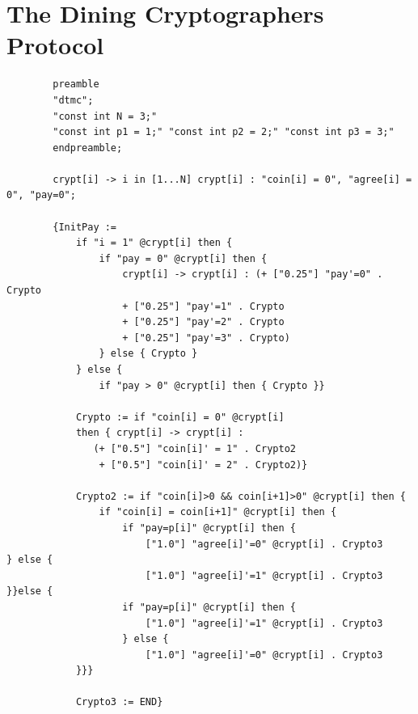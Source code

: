 \section{The Dining Cryptographers Protocol}
\label{app:dining-cryptos}
\begin{listing}[h!]
	\begin{verbatim}
		preamble
		"dtmc";
		"const int N = 3;"
		"const int p1 = 1;" "const int p2 = 2;" "const int p3 = 3;"
		endpreamble;
		
		crypt[i] -> i in [1...N] crypt[i] : "coin[i] = 0", "agree[i] = 0", "pay=0";
		
		{InitPay :=
			if "i = 1" @crypt[i] then {
				if "pay = 0" @crypt[i] then {
					crypt[i] -> crypt[i] : (+ ["0.25"] "pay'=0" . Crypto
					+ ["0.25"] "pay'=1" . Crypto
					+ ["0.25"] "pay'=2" . Crypto
					+ ["0.25"] "pay'=3" . Crypto)
				} else { Crypto }
			} else {
				if "pay > 0" @crypt[i] then { Crypto }}	
					
			Crypto := if "coin[i] = 0" @crypt[i]
			then { crypt[i] -> crypt[i] : 
			   (+ ["0.5"] "coin[i]' = 1" . Crypto2
				+ ["0.5"] "coin[i]' = 2" . Crypto2)}
							
			Crypto2 := if "coin[i]>0 && coin[i+1]>0" @crypt[i] then {
				if "coin[i] = coin[i+1]" @crypt[i] then {
					if "pay=p[i]" @crypt[i] then {
						["1.0"] "agree[i]'=0" @crypt[i] . Crypto3     } else {
						["1.0"] "agree[i]'=1" @crypt[i] . Crypto3 }}else {
					if "pay=p[i]" @crypt[i] then {
						["1.0"] "agree[i]'=1" @crypt[i] . Crypto3
					} else {
						["1.0"] "agree[i]'=0" @crypt[i] . Crypto3
			}}}	
		
			Crypto3 := END}		
	\end{verbatim}
	\caption{The Dining Cryptographers Protocol in the specified syntax}
	\label{lst:dining}
\end{listing}
